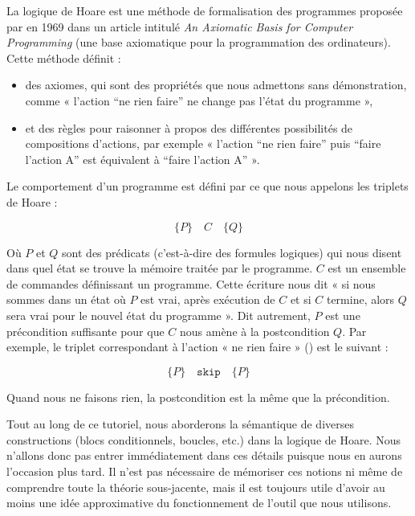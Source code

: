 

La logique de Hoare est une méthode de formalisation des programmes proposée
par 
en 1969 dans un article intitulé \textit{An Axiomatic Basis for
Computer Programming} (une base axiomatique pour la programmation des
ordinateurs). Cette méthode définit :
\begin{itemize}
\item des axiomes, qui sont des propriétés que nous admettons sans démonstration,
comme « l'action “ne rien faire” ne change pas l'état du programme »,
\item et des règles pour raisonner à propos des différentes possibilités de
compositions d'actions, par exemple « l'action “ne rien faire” puis “faire
l'action A” est équivalent à “faire l'action A” ».
\end{itemize}


Le comportement d'un programme est défini par ce que nous appelons les triplets
de Hoare :



$$\{P\} \quad C \quad \{Q\}$$



Où $P$ et $Q$ sont des prédicats (c'est-à-dire des formules logiques) qui nous disent dans
quel état se trouve la mémoire traitée par le programme. $C$ est un ensemble de
commandes définissant un programme. Cette écriture nous dit « si nous sommes
dans un état où $P$ est vrai, après exécution de $C$ et si $C$ termine,
alors $Q$ sera vrai pour le nouvel état du programme ». Dit autrement, $P$ est
une précondition suffisante pour que $C$ nous amène à la postcondition $Q$.
Par exemple, le triplet correspondant à l'action « ne rien faire »
() est le suivant :




$$\{P\} \quad \texttt{skip} \quad \{P\}$$



Quand nous ne faisons rien, la postcondition est la même que la précondition.



Tout au long de ce tutoriel, nous aborderons la sémantique de diverses
constructions (blocs conditionnels, boucles, etc.) dans la logique de Hoare.
Nous n'allons donc pas entrer immédiatement dans ces détails puisque nous en
aurons l'occasion plus tard. Il n'est pas nécessaire de mémoriser ces notions
ni même de comprendre toute la théorie sous-jacente, mais il est toujours utile
d'avoir au moins une idée approximative du fonctionnement de l'outil que nous
utilisons.



